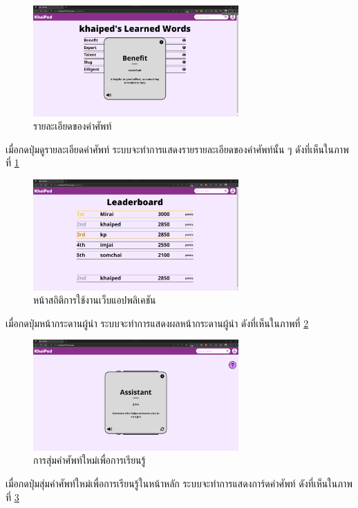 \documentclass[12pt,oneside,openright,a4paper]{cpe-thai-project}
\begin{document}
\pagebreak
\begin{figure}[!h]\centering
	\includegraphics[width=0.7\textwidth, keepaspectratio=true]{image/chap4/UI/stat/word detail.png}
	\caption{{รายละเอียดของคำศัพท์}}\label{fig:chap4UIStatWordDetail}
\end{figure}
\hspace{1cm}
เมื่อกดปุ่มดูรายละเอียดคำศัพท์ ระบบจะทำการแสดงรายรายละเอียดของคำศัพท์นั้น ๆ
ดังที่เห็นในภาพที่ \ref{fig:chap4UIStatWordDetail}

\begin{figure}[!h]\centering
	\includegraphics[width=0.7\textwidth, keepaspectratio=true]{image/chap4/UI/stat/leaderboard.png}
	\caption{{หน้าสถิติการใช้งานเว็บแอปพลิเคชัน}}\label{fig:chap4UILead}
\end{figure}
\hspace{1cm}
เมื่อกดปุ่มหน้ากระดานผู้นำ ระบบจะทำการแสดงผลหน้ากระดานผู้นำ ดังที่เห็นในภาพที่ \ref{fig:chap4UILead}

\pagebreak
\begin{figure}[!h]\centering
	\includegraphics[width=0.7\textwidth, keepaspectratio=true]{image/chap4/UI/random.png}
	\caption{{การสุ่มคำศัพท์ใหม่เพื่อการเรียนรู้}}\label{fig:chap4UIRandom}
\end{figure}
\hspace{1cm}
เมื่อกดปุ่มสุ่มคำศัพท์ใหม่เพื่อการเรียนรู้ในหน้าหลัก ระบบจะทำการแสดงการ์ดคำศัพท์ ดังที่เห็นในภาพที่ \ref{fig:chap4UIRandom}
\end{document}

